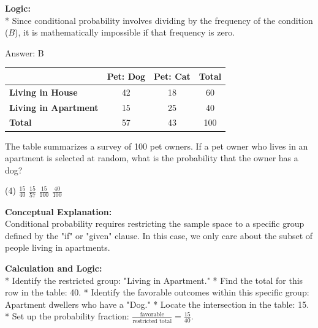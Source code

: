 \documentclass[11pt,paper=a4,answers]{exam}
\begin{document}
\begin{questions}
\begin{solution}
\textbf{Logic:} \\
* Since conditional probability involves dividing by the frequency of the condition ($B$), it is mathematically impossible if that frequency is zero.

\vspace{30pt}

Answer: \colorbox{yellow!100}{B}
\end{solution}

\question
\begin{center}
\begin{tabular}{|l|c|c|c|}
\hline
 & \textbf{Pet: Dog} & \textbf{Pet: Cat} & \textbf{Total} \\ \hline
\textbf{Living in House} & 42 & 18 & 60 \\ \hline
\textbf{Living in Apartment} & 15 & 25 & 40 \\ \hline
\textbf{Total} & 57 & 43 & 100 \\ \hline
\end{tabular}
\end{center}
The table summarizes a survey of 100 pet owners. If a pet owner who lives in an apartment is selected at random, what is the probability that the owner has a dog?
\begin{tasks}(4)
    \task $\frac{15}{40}$
    \task $\frac{15}{57}$
    \task $\frac{15}{100}$
    \task $\frac{40}{100}$
\end{tasks}

\begin{solution}
\textbf{Conceptual Explanation:} \\
Conditional probability requires restricting the sample space to a specific group defined by the "if" or "given" clause. In this case, we only care about the subset of people living in apartments.

\vspace{30pt}

\textbf{Calculation and Logic:} \\
* Identify the restricted group: "Living in Apartment."
* Find the total for this row in the table: 40.
* Identify the favorable outcomes within this specific group: Apartment dwellers who have a "Dog."
* Locate the intersection in the table: 15.
* Set up the probability fraction: $\frac{\text{favorable}}{\text{restricted total}} = \frac{15}{40}$.

\vspace{30pt}


\end{solution}
\end{questions}
\end{document}
